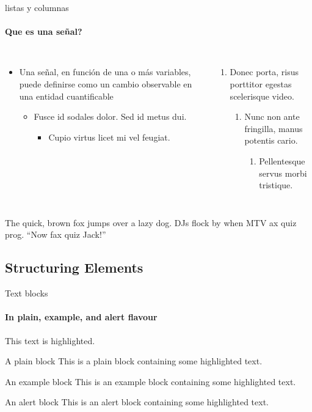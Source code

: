 \documentclass{beamer}
\begin{document}
\begin{darkframes}
    \begin{frame}[label=lists]{listas y columnas}
      \framesubtitle{Que es una señal?}
      \begin{columns}[onlytextwidth]
          \begin{itemize}
            \item {Una señal, en función de una o más variables, puede definirse como un cambio observable en una entidad cuantificable}
            \begin{itemize}
              \item Fusce id sodales dolor. Sed id metus dui.
              \begin{itemize}
                \item Cupio virtus licet mi vel feugiat.
              \end{itemize}
            \end{itemize}
          \end{itemize}
          \begin{enumerate}
            \item Donec porta, risus porttitor egestas scelerisque video.
            \begin{enumerate}
              \item Nunc non ante fringilla, manus potentis cario.
              \begin{enumerate}
                \item Pellentesque servus morbi tristique.
              \end{enumerate}
            \end{enumerate}
          \end{enumerate}
      \end{columns}
      \bigskip
      \justifying

      {The quick, brown fox jumps over a lazy
      dog. DJs flock by when MTV ax quiz prog. “Now fax quiz Jack!”}
    \end{frame}

    \subsection{Structuring Elements}
    \begin{frame}[label=simmonshall]{Text blocks}
      \framesubtitle{In plain, example, and \alert{alert} flavour}
      \alert{This text} is highlighted.

      \begin{block}{A plain block}
        This is a plain block containing some \alert{highlighted text}.
      \end{block}
      \begin{exampleblock}{An example block}
        This is an example block containing some \alert{highlighted text}.
      \end{exampleblock}
      \begin{alertblock}{An alert block}
        This is an alert block containing some \alert{highlighted text}.
      \end{alertblock}
    \end{frame}


\end{darkframes}
\end{document}
